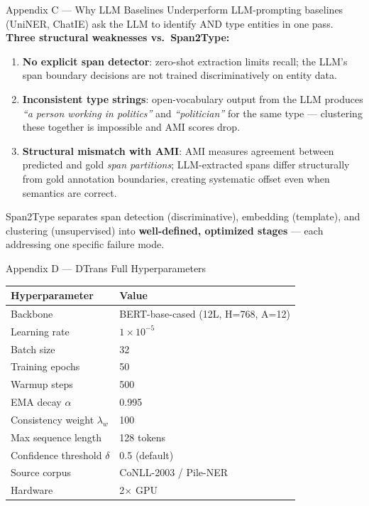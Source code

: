 \documentclass[aspectratio=169,10pt]{beamer}
\begin{document}
\begin{frame}{Appendix C — Why LLM Baselines Underperform}
  LLM-prompting baselines (UniNER, ChatIE) ask the LLM to identify AND type entities in one pass.\\[0.5em]

  \textbf{Three structural weaknesses vs.\ Span2Type:}
  \vspace{0.4em}
  \begin{enumerate}
    \setlength{\itemsep}{0.5em}
    \item \textbf{No explicit span detector}: zero-shot extraction limits recall; the LLM's span boundary decisions are not trained discriminatively on entity data.

    \item \textbf{Inconsistent type strings}: open-vocabulary output from the LLM produces \textit{``a person working in politics''} and \textit{``politician''} for the same type — clustering these together is impossible and AMI scores drop.

    \item \textbf{Structural mismatch with AMI}: AMI measures agreement between predicted and gold \emph{span partitions}; LLM-extracted spans differ structurally from gold annotation boundaries, creating systematic offset even when semantics are correct.
  \end{enumerate}

  \vspace{0.4em}
  Span2Type separates span detection (discriminative), embedding (template), and clustering (unsupervised) into \textbf{well-defined, optimized stages} — each addressing one specific failure mode.
\end{frame}

\begin{frame}{Appendix D — DTrans Full Hyperparameters}
  \footnotesize
  \begin{tabular}{ll}
    \toprule
    \textbf{Hyperparameter} & \textbf{Value} \\
    \midrule
    Backbone & BERT-base-cased (12L, H=768, A=12) \\
    Learning rate & $1\times10^{-5}$ \\
    Batch size & 32 \\
    Training epochs & 50 \\
    Warmup steps & 500 \\
    EMA decay $\alpha$ & 0.995 \\
    Consistency weight $\lambda_w$ & 100 \\
    Max sequence length & 128 tokens \\
    Confidence threshold $\delta$ & 0.5 (default) \\
    Source corpus & CoNLL-2003 / Pile-NER \\
    Hardware & 2$\times$ GPU \\
    \bottomrule
  \end{tabular}
\end{frame}
\end{document}

